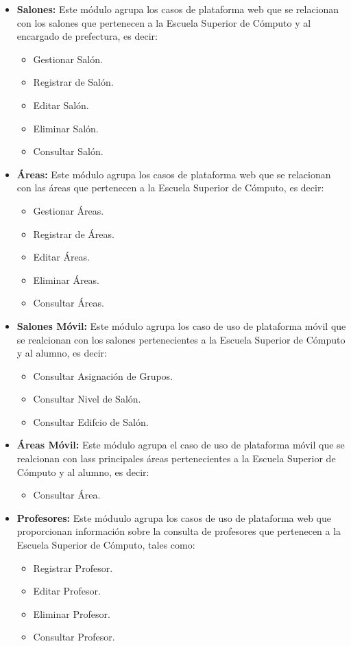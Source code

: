     \begin{itemize}
	\item {\bf Salones:} Este módulo agrupa los casos de plataforma web  que se relacionan con los salones que pertenecen a la Escuela Superior de Cómputo y al encargado de prefectura, es decir:
	\begin{itemize}
		\item Gestionar Salón.
		\item Registrar de Salón.
		\item Editar Salón.
		\item Eliminar Salón.
		\item Consultar Salón.
	\end{itemize}

  
	\item {\bf Áreas:} Este módulo agrupa los casos de plataforma web  que se relacionan con las áreas que pertenecen a la Escuela Superior de Cómputo, es decir:
	\begin{itemize}
		\item Gestionar Áreas.
		\item Registrar de Áreas.
		\item Editar Áreas.
		\item Eliminar Áreas.
		\item Consultar Áreas.
	\end{itemize}

	\item {\bf Salones Móvil:} Este módulo agrupa los caso de uso de plataforma móvil que se realcionan con los salones pertenecientes a la Escuela Superior de Cómputo y al alumno, es decir:
		\begin{itemize}
			\item Consultar Asignación de Grupos.
			\item Consultar Nivel de Salón.
			\item Consultar Edifcio de Salón.
		\end{itemize}

	\item {\bf Áreas Móvil:} Este módulo agrupa el caso de uso de plataforma móvil que se realcionan con lass principales áreas pertenecientes a la Escuela Superior de Cómputo y al alumno, es decir:
	\begin{itemize}
		\item Consultar Área.
	\end{itemize}

	\item {\bf Profesores:} Este móduulo agrupa los casos de uso de plataforma web que proporcionan información sobre la consulta de profesores que pertenecen a la Escuela Superior de Cómputo, tales como:
	\begin{itemize}
		\item Registrar Profesor.
		\item Editar Profesor.
		\item Eliminar Profesor.
		\item Consultar Profesor.
	\end{itemize} 


\end{itemize}
